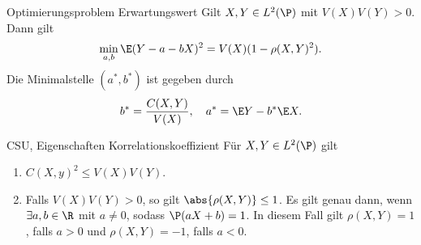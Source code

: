 \begin{karte}{Optimierungsproblem Erwartungswert}
    Gilt \( X,Y \in L^2(\P) \) mit \( V(X)V(Y) > 0 \). 
    Dann gilt 
    \[ \min_{a,b} \E(Y - a - bX)^2 = V(X) (1 - \rho(X,Y)^2). \]
    Die Minimalstelle \( (a^*, b^*) \) ist gegeben durch 
    \[ b^* = \frac{C(X,Y)}{V(X)}, \quad a^* = \E Y - b^* \E X. \]
\end{karte}

\begin{karte}{CSU, Eigenschaften Korrelationskoeffizient}
    Für \( X,Y \in L^2(\P) \) gilt 
    \begin{enumerate}
        \item \( C(X,y)^2 \leq V(X) V(Y) \).
        \item Falls \( V(X)V(Y) > 0 \), so gilt \( \abs{\rho(X,Y)} \leq 1 \).
        Es gilt \gqq{\(=\)} genau dann, 
        wenn \( \exists a,b\in \R \) mit \( a \neq 0 \), sodass \( \P(aX + b) = 1 \).
        In diesem Fall gilt \( \rho(X,Y) = 1 \), falls \( a > 0 \) und 
        \( \rho(X,Y) = -1 \), falls \( a < 0 \).
    \end{enumerate}
\end{karte}